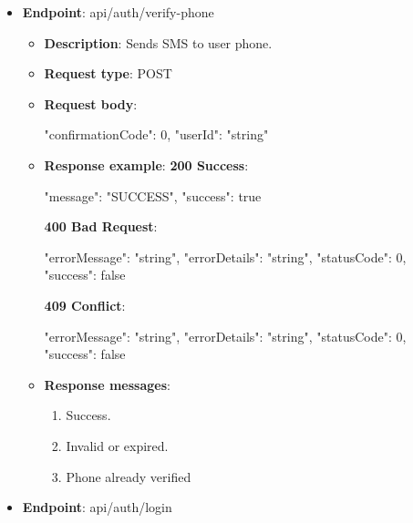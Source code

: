 \begin{itemize}
    \item \textbf{Endpoint}: api/auth/verify-phone
    \begin{itemize}
        \item \textbf{Description}: Sends SMS to user phone.
        \item \textbf{Request type}: POST
        \item \textbf{Request body}:
        \begin{spverbatim}
        {
            "confirmationCode": 0,
            "userId": "string"
        }
        \end{spverbatim}
        \item  \textbf{Response example}:
        \textbf{200 Success}:
        \begin{spverbatim}
        {
            "message": "SUCCESS",
            "success": true
        }
        \end{spverbatim}
        \textbf{400 Bad Request}:
        \begin{spverbatim}
        {
            "errorMessage": "string",
            "errorDetails": "string",
            "statusCode": 0,
            "success": false
        }
        \end{spverbatim}
        \textbf{409 Conflict}:
        \begin{spverbatim}
        {
            "errorMessage": "string",
            "errorDetails": "string",
            "statusCode": 0,
            "success": false
        }
        \end{spverbatim}
        \item \textbf{Response messages}:
        \begin{enumerate}
            \item Success.
            \item Invalid or expired.
            \item Phone already verified
        \end{enumerate}
    \end{itemize}

    \item \textbf{Endpoint}: api/auth/login


\end{itemize}
